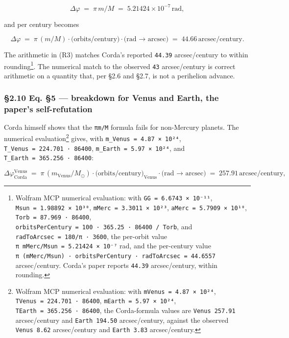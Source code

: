 \documentclass[
  11pt,
]{article}
\begin{document}
\[
\Delta\varphi \;=\; \pi\,m/M
\;=\; 5.21424 \times 10^{-7}\,\text{rad}, \tag{R2}
\]

and per century becomes

\[
\Delta\varphi
\;=\; \pi\,(m/M) \cdot \text{(orbits/century)} \cdot \text{(rad → arcsec)}
\;=\; 44.66\,\text{arcsec/century}. \tag{R3}
\]

The arithmetic in (R3) matches Corda's reported \texttt{44.39}
arcsec/century to within rounding\footnote{Wolfram MCP numerical
  evaluation: with \texttt{GG\ =\ 6.6743\ ×\ 10⁻¹¹},
  \texttt{Msun\ =\ 1.98892\ ×\ 10³⁰},
  \texttt{mMerc\ =\ 3.3011\ ×\ 10²³},
  \texttt{aMerc\ =\ 5.7909\ ×\ 10¹⁰},
  \texttt{Torb\ =\ 87.969\ ·\ 86400},
  \texttt{orbitsPerCentury\ =\ 100\ ·\ 365.25\ ·\ 86400\ /\ Torb}, and
  \texttt{radToArcsec\ =\ 180/π\ ·\ 3600}, the per-orbit value
  \texttt{π\ mMerc/Msun\ =\ 5.21424\ ×\ 10⁻⁷} rad, and the per-century
  value
  \texttt{π\ (mMerc/Msun)\ ·\ orbitsPerCentury\ ·\ radToArcsec\ =\ 44.6557}
  arcsec/century. Corda's paper reports \texttt{44.39} arcsec/century,
  within rounding.}. The numerical match to the observed \texttt{43}
arcsec/century is correct arithmetic on a quantity that, per §2.6 and
§2.7, is not a perihelion advance.

\hypertarget{eq.-5-breakdown-for-venus-and-earth-the-papers-self-refutation}{%
\subsubsection{§2.10 Eq. §5 --- breakdown for Venus and Earth, the
paper's
self-refutation}\label{eq.-5-breakdown-for-venus-and-earth-the-papers-self-refutation}}

Corda himself shows that the \texttt{πm/M} formula fails for non-Mercury
planets. The numerical evaluation\footnote{Wolfram MCP numerical
  evaluation: with \texttt{mVenus\ =\ 4.87\ ×\ 10²⁴},
  \texttt{TVenus\ =\ 224.701\ ·\ 86400},
  \texttt{mEarth\ =\ 5.97\ ×\ 10²⁴},
  \texttt{TEarth\ =\ 365.256\ ·\ 86400}, the Corda-formula values are
  \texttt{Venus\ 257.91} arcsec/century and \texttt{Earth\ 194.50}
  arcsec/century, against the observed \texttt{Venus\ 8.62}
  arcsec/century and \texttt{Earth\ 3.83} arcsec/century.} gives, with
\texttt{m\_Venus\ =\ 4.87\ ×\ 10²⁴},
\texttt{T\_Venus\ =\ 224.701\ ·\ 86400},
\texttt{m\_Earth\ =\ 5.97\ ×\ 10²⁴}, and
\texttt{T\_Earth\ =\ 365.256\ ·\ 86400}:

\[
\Delta\varphi^{\text{Venus}}_{\text{Corda}}
\;=\; \pi\,(m_{\text{Venus}}/M_{\odot})
\cdot \text{(orbits/century)}_{\text{Venus}}
\cdot \text{(rad → arcsec)}
\;=\; 257.91\,\text{arcsec/century}, \tag{R4}
\]
\end{document}
